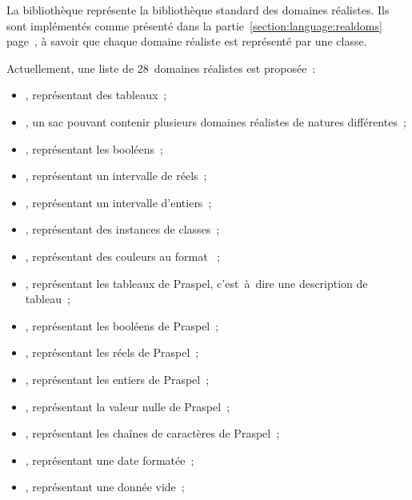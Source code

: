 La bibliothèque  représente la bibliothèque standard
des domaines réalistes. Ils sont implémentés comme présenté dans la
partie~\ref{section:language:realdoms} page~\pageref{section:language:realdoms},
à savoir que chaque domaine réaliste est représenté par une classe.

Actuellement, une liste de 28~domaines réalistes est proposée~:
%
\begin{itemize}

\item {}, représentant des tableaux~;

\item {}, un sac pouvant contenir plusieurs domaines réalistes de
natures différentes~;

\item {}, représentant les booléens~;

\item {}, représentant un intervalle de réels~;

\item {}, représentant un intervalle d'entiers~;

\item {}, représentant des instances de classes~;

\item {}, représentant des couleurs au format ~;

\item {}, représentant les tableaux de Praspel, c'est~à~dire une
description de tableau~;

\item {}, représentant les booléens de Praspel~;

\item {}, représentant les réels de Praspel~;

\item {}, représentant les entiers de Praspel~;

\item {}, représentant la valeur nulle de Praspel~;

\item {}, représentant les chaînes de caractères de Praspel~;

\item {}, représentant une date formatée~;

\item {}, représentant une donnée vide~;


\end{itemize}
